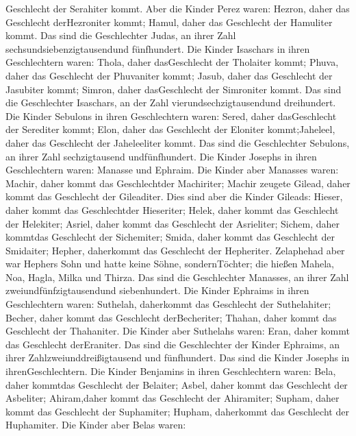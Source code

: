 Geschlecht der Serahiter kommt.  Aber die Kinder Perez
waren: Hezron, daher das Geschlecht derHezroniter kommt; Hamul, daher
das Geschlecht der Hamuliter kommt.  Das sind die
Geschlechter Judas, an ihrer Zahl sechsundsiebenzigtausendund
fünfhundert.  Die Kinder Isaschars in ihren Geschlechtern
waren: Thola, daher dasGeschlecht der Tholaiter kommt; Phuva, daher das
Geschlecht der Phuvaniter kommt;  Jasub, daher das
Geschlecht der Jasubiter kommt; Simron, daher dasGeschlecht der
Simroniter kommt.  Das sind die Geschlechter Isaschars, an
der Zahl vierundsechzigtausendund dreihundert.  Die Kinder
Sebulons in ihren Geschlechtern waren: Sered, daher dasGeschlecht der
Serediter kommt; Elon, daher das Geschlecht der Eloniter kommt;Jaheleel,
daher das Geschlecht der Jaheleeliter kommt.  Das sind die
Geschlechter Sebulons, an ihrer Zahl sechzigtausend undfünfhundert.
 Die Kinder Josephs in ihren Geschlechtern waren: Manasse
und Ephraim.  Die Kinder aber Manasses waren: Machir, daher
kommt das Geschlechtder Machiriter; Machir zeugete Gilead, daher kommt
das Geschlecht der Gileaditer.  Dies sind aber die Kinder
Gileads: Hieser, daher kommt das Geschlechtder Hieseriter; Helek, daher
kommt das Geschlecht der Helekiter;  Asriel, daher kommt
das Geschlecht der Asrieliter; Sichem, daher kommtdas Geschlecht der
Sichemiter;  Smida, daher kommt das Geschlecht der
Smidaiter; Hepher, daherkommt das Geschlecht der Hepheriter.
 Zelaphehad aber war Hephers Sohn und hatte keine Söhne,
sondernTöchter; die hießen Mahela, Noa, Hagla, Milka und Thirza.
 Das sind die Geschlechter Manasses, an ihrer Zahl
zweiundfünfzigtausendund siebenhundert.  Die Kinder
Ephraims in ihren Geschlechtern waren: Suthelah, daherkommt das
Geschlecht der Suthelahiter; Becher, daher kommt das Geschlecht
derBecheriter; Thahan, daher kommt das Geschlecht der Thahaniter.
 Die Kinder aber Suthelahs waren: Eran, daher kommt das
Geschlecht derEraniter.  Das sind die Geschlechter der
Kinder Ephraims, an ihrer Zahlzweiunddreißigtausend und fünfhundert. Das
sind die Kinder Josephs in ihrenGeschlechtern.  Die Kinder
Benjamins in ihren Geschlechtern waren: Bela, daher kommtdas Geschlecht
der Belaiter; Asbel, daher kommt das Geschlecht der Asbeliter;
Ahiram,daher kommt das Geschlecht der Ahiramiter;  Supham,
daher kommt das Geschlecht der Suphamiter; Hupham, daherkommt das
Geschlecht der Huphamiter.  Die Kinder aber Belas waren:
